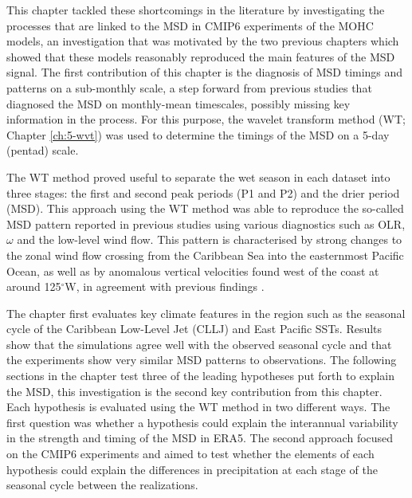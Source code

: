This chapter tackled these shortcomings in the literature by investigating the processes that are linked to the MSD in CMIP6 experiments of the MOHC models, an investigation that was motivated by the two previous chapters which showed that these models reasonably reproduced the main features of the MSD signal.
The first contribution of this chapter is the diagnosis of MSD timings and patterns on a sub-monthly scale, a step forward from previous studies that diagnosed the MSD on monthly-mean timescales, possibly missing key information in the process. 
For this purpose, the wavelet transform method (WT; Chapter \ref{ch:5-wvt}) was used to determine the timings of the MSD on a 5-day (pentad) scale. 


The WT method proved useful to separate the wet season in each dataset into three stages: the first and second peak periods (P1 and P2) and the drier period (MSD). 
This approach using the WT method was able to reproduce the so-called MSD pattern reported in previous studies \citep{zermeno2019,zhao2020} using various diagnostics such as OLR, $\omega$ and the low-level wind flow. This pattern is characterised by strong changes to the zonal wind flow crossing from the Caribbean Sea into the easternmost Pacific Ocean, as well as by anomalous vertical velocities found west of the coast at around 125$^\circ$W, in agreement with previous findings \citep{herrera2015,zermeno2019}. 

The chapter first evaluates key climate features in the region such as the seasonal cycle of the Caribbean Low-Level Jet (CLLJ) and East Pacific SSTs. Results show that the simulations agree well with the observed seasonal cycle and that the experiments show very similar MSD patterns to observations. 
The following sections in the chapter test three of the leading hypotheses put forth to explain the MSD, this investigation is the second key contribution from this chapter.
 Each hypothesis is evaluated using the WT method in two different ways. The first question was whether a hypothesis could explain  the interannual variability in the strength and timing of the MSD  in ERA5. The second approach focused on the CMIP6 experiments and aimed to test whether the elements of each hypothesis could explain the differences in precipitation at each stage of the seasonal cycle between the realizations.
 
